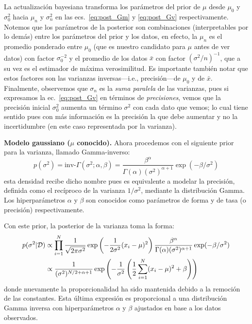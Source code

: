 \begin{remark}
	La actualización bayesiana transforma los parámetros del prior de  $\mu$ desde  $\mu_0$ y $\sigma_0^2$ hacia $\mu_n$ y $\sigma_n^2$ en las ecs.~\eqref{eq:post_Gm} y \eqref{eq:post_Gv} respectivamente. Notemos que los  parámetros de la posterior son combinaciones (interpretables por lo demás) entre los parámetros del prior y los datos, en efecto, la $\mu_n$ es el promedio ponderado entre  $\mu_0$ (que es nuestro candidato para $\mu$ antes de ver datos) con factor $\sigma_0^{-2}$ y el promedio de los datos $\bar{x}$ con factor $(\sigma^{2}/n)^{-1}$, que a su vez es el estimador de máxima verosimilitud. Es importante también notar que  estos  factores son las varianzas inversas---i.e., precisión---de $\mu_0$ y de $\bar{x}$. Finalmente, observemos que $\sigma_n$ es la \emph{suma paralela} de las varianzas, pues  si expresamos la ec.~\eqref{eq:post_Gv} en términos de \emph{precisiones}, vemos que la precisión inicial $\sigma_0^2$ aumenta un término $\sigma^2$ con cada dato que vemos; lo cual tiene sentido pues con más información es la precisión la que debe aumentar y no la incertidumbre (en este caso representada por la varianza).
\end{remark}

\textbf{Modelo gaussiano ($\mu$ conocido).} Ahora procedemos con el siguiente prior para la varianza, llamado Gamma-inverso:
 \begin{equation}
 	p(\sigma^2)= \text{inv-}\Gamma(\sigma^2;\alpha,\beta) = \frac{\beta^\alpha}{\Gamma(\alpha) (\sigma^2)^{\alpha+1}}\exp(-\beta/\sigma^2)
 \end{equation}
 esta densidad recibe dicho nombre pues es equivalente a modelar la precisión, definida como el recíproco de la varianza $1/\sigma^2$, mediante la distribución Gamma. Los hiperparámetros $\alpha$ y $\beta$ son conocidos como parámetros de forma y de tasa (o precisión) respectivamente. 

 Con este prior, la posterior de la varianza toma la forma:
 \begin{align}
 	p(\sigma^2|{\mathcal D}) &\propto \prod_{i=1}^N \frac{1}{\sqrt{2\pi\sigma^2}}\exp\left(-\frac{1}{2\sigma^2}(x_i-\mu)^2\right) \frac{\beta^\alpha}{\Gamma(\alpha) (\sigma^2)^{\alpha+1}}\exp(-\beta/\sigma^2)\\
 	&\propto  \frac{1}{(\sigma^2)^{N/2+\alpha+1}}\exp\left(-\frac{1}{\sigma^2}\left(\frac{1}{2}\sum_{i=1}^N(x_i-\mu)^2 +\beta\right) \right)\nonumber
 \end{align} 
 donde nuevamente la proporcionalidad ha sido mantenida debido a la remoción de las constantes. Esta última expresión es proporcional a una distribución Gamma inversa con hiperparámetros $\alpha$ y $\beta$ ajustados en base a los datos observados. 

